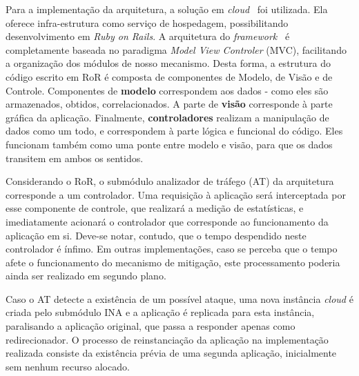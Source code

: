 Para a implementação da arquitetura, a solução em \emph{cloud}~\cite{heroku} foi utilizada. Ela oferece infra-estrutura como serviço de hospedagem, possibilitando desenvolvimento em \emph{Ruby on Rails}. %
%
%
A arquitetura do \emph{framework}~\cite{ror} é completamente baseada no paradigma \emph{Model View Controler} (MVC), facilitando a organização dos módulos de nosso mecanismo. Desta forma, a estrutura do código escrito em RoR é composta de componentes de Modelo, de Visão e de Controle. Componentes de \textbf{modelo} correspondem aos dados - como eles são armazenados, obtidos, correlacionados. A parte de \textbf{visão} corresponde à parte gráfica da aplicação. Finalmente, \textbf{controladores} realizam a manipulação de dados como um todo, e correspondem à parte lógica e funcional do código. Eles funcionam também como uma ponte entre modelo e visão, para que os dados transitem em ambos os sentidos.
%

Considerando o RoR, o submódulo analizador de tráfego (AT) da arquitetura corresponde a um controlador. Uma requisição à aplicação será interceptada por esse componente de controle, que realizará a medição de estatísticas, e imediatamente acionará o controlador que corresponde ao funcionamento da aplicação em si. Deve-se notar, contudo, que o tempo despendido neste controlador é ínfimo. Em outras implementações, caso se perceba que o tempo afete o funcionamento do mecanismo de mitigação, este processamento poderia ainda ser realizado em segundo plano.

Caso o AT detecte a existência de um possível ataque, uma nova instância \emph{cloud} é criada pelo submódulo INA e a aplicação é replicada para esta instância, paralisando a aplicação original, que passa a responder apenas como redirecionador. O processo de reinstanciação da aplicação na implementação realizada consiste da existência prévia de uma segunda aplicação, inicialmente sem nenhum recurso alocado. %

